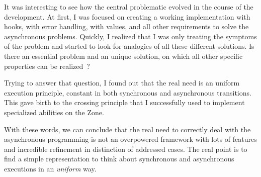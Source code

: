 It was interesting to see how the central problematic evolved in the course of the development. At first, I was focused on creating a working implementation with hooks, with error handling, with values, and all other requirements to solve the asynchronous problems. Quickly, I realized that I was only treating the symptoms of the problem and started to look for analogies of all these different solutions. Is there an essential problem and an unique solution, on which all other specific properties can be realized~?

Trying to answer that question, I found out that the real need is an uniform execution principle, constant in both synchronous and asynchronous transitions. This gave birth to the crossing principle that I successfully used to implement specialized abilities on the Zone.

With these words, we can conclude that the real need to correctly deal with the asynchronous programming is not an overpowered framework with lots of features and incredible refinement in distinction of addressed cases. The real point is to find a simple representation to think about synchronous and asynchronous executions in an \emph{uniform} way.
